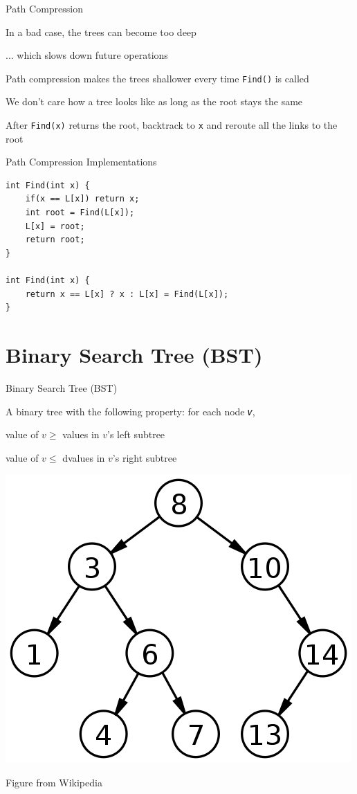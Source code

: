 \documentclass[13pt,onlymath]{beamer}
\begin{document}
\begin{frame}[fragile]{Path Compression}
\BIT
\item In a bad case, the trees can become too deep
\BIT
\item ... which slows down future operations
\EIT
\item Path compression makes the trees shallower every time \verb,Find(), is called
\item We don't care how a tree looks like as long as the root stays the same
\BIT
\item After \verb,Find(x), returns the root, backtrack to \verb,x, and reroute all the links to the root
\EIT
\EIT
\end{frame}

\begin{frame}[fragile]{Path Compression Implementations}
\begin{Verbatim}[xleftmargin=25pt]
int Find(int x) {
    if(x == L[x]) return x;
    int root = Find(L[x]);
    L[x] = root;
    return root;
}

int Find(int x) {
    return x == L[x] ? x : L[x] = Find(L[x]);
}
\end{Verbatim}
\end{frame}


\section{Binary Search Tree (BST)}

\begin{frame}[fragile]{Binary Search Tree (BST)}
\BIT
\item A binary tree with the following property: for each node 𝑣,
\BIT
\item value of $v \ge $ values in $v$'s left subtree
\item value of $v \le $ dvalues in $v$'s right subtree
\EIT
\EIT
\begin{center}
\includegraphics[height=0.4\textheight]{figures/bst.png}

Figure from Wikipedia
\end{center}
\end{frame}
\end{document}
